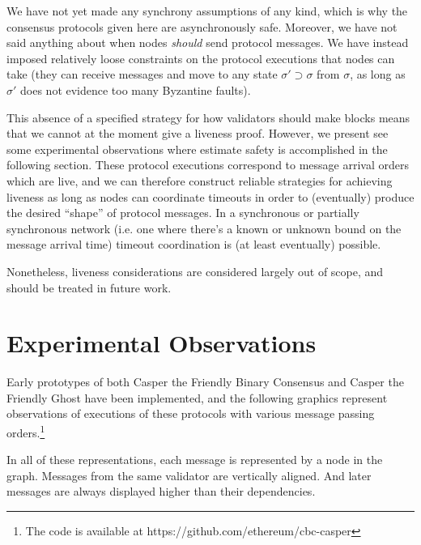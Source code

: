 \documentclass{article}
\theoremstyle{definition}
\begin{document}
We have not yet made any synchrony assumptions of any kind, which is why the consensus protocols given here are asynchronously safe. Moreover, we have not said anything about when nodes \emph{should} send protocol messages. We have instead imposed relatively loose constraints on the protocol executions that nodes can take (they can receive messages and move to any state $\sigma' \supset \sigma$ from $\sigma$, as long as $\sigma'$ does not evidence too many Byzantine faults).

This absence of a specified strategy for how validators should make blocks means that we cannot at the moment give a liveness proof. However, we present see some experimental observations where estimate safety is accomplished in the following section. These protocol executions correspond to message arrival orders which are live, and we can therefore construct reliable strategies for achieving liveness as long as nodes can coordinate timeouts in order to (eventually) produce the desired ``shape'' of protocol messages. In a synchronous or partially synchronous network (i.e. one where there's a known or unknown bound on the message arrival time) timeout coordination is (at least eventually) possible.

Nonetheless, liveness considerations are considered largely out of scope, and should be treated in future work.

\pagebreak
\section{Experimental Observations}

Early prototypes of both Casper the Friendly Binary Consensus and Casper the Friendly Ghost have been implemented, and the following graphics represent observations of executions of these protocols with various message passing orders.\footnote{The code is available at https://github.com/ethereum/cbc-casper}

In all of these representations, each message is represented by a node in the graph. Messages from the same validator are vertically aligned. And later messages are always displayed higher than their dependencies.
\end{document}
